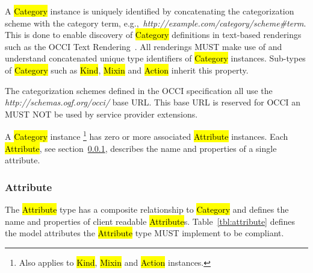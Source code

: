\documentclass[10pt,a4paper]{article}
\begin{document}

A \hl{Category} instance is uniquely identified by concatenating the
categorization scheme with the category term,
e.g.,~\textit{http://example.com/category/scheme\#term}.  This is done
to enable discovery of \hl{Category} definitions in text-based
renderings such as the OCCI Text Rendering~\cite{occi:text}. All renderings
MUST make use of and understand concatenated unique type identifiers of \hl{Category}
instances.
%
Sub-types of \hl{Category} such as \hl{Kind}, \hl{Mixin} and \hl{Action} inherit
this property.

The categorization schemes defined in the OCCI specification all use
the \textit{http://schemas.ogf.org/occi/} base URL. This base URL is
reserved for OCCI an MUST NOT be used by service provider extensions.

A \hl{Category} instance%
\footnote{Also applies to \hl{Kind}, \hl{Mixin} and \hl{Action} instances.}
has zero or more associated \hl{Attribute} instances.
Each \hl{Attribute}, see section~\ref{sec:attribute},
describes the name and properties of a single attribute.


\subsubsection{Attribute}
\label{sec:attribute}

The \hl{Attribute} type has a composite relationship to \hl{Category} and
defines the name and properties of client readable \hl{Attribute}s.
%
Table~\ref{tbl:attribute} defines the model attributes the \hl{Attribute} type
MUST implement to be compliant.
\end{document}
